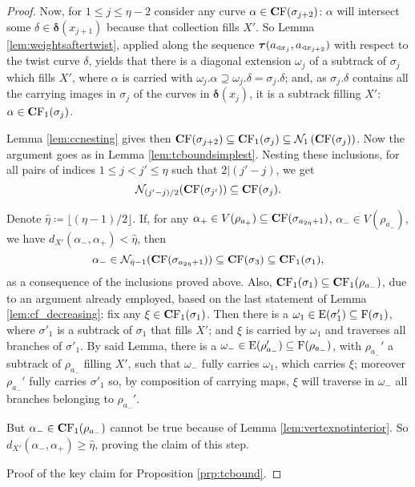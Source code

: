 \begin{proof}
Now, for $1\leq j\leq \eta-2$ consider any curve $\alpha\in \mathbf C \mathrm F(\sigma_{j+2})$: $\alpha$ will intersect some $\delta\in \bm\delta(x_{j+1})$ because that collection fills $X'$. So Lemma \ref{lem:weightsaftertwist}, applied along the sequence $\bm\tau(a_{\triangleleft x_j},a_{\triangleleft x_{j+2}})$ with respect to the twist curve $\delta$, yields that there is a diagonal extension $\omega_j$ of a subtrack of $\sigma_j$ which fills $X'$, where $\alpha$ is carried with $\omega_j.\alpha\supseteq \omega_j.\delta=\sigma_j.\delta$; and, as $\sigma_j.\delta$ contains all the carrying images in $\sigma_j$ of the curves in $\bm\delta(x_j)$, it is a subtrack filling $X'$: $\alpha\in \mathbf C \mathrm F_1(\sigma_j)$.

Lemma \ref{lem:ccnesting} gives then $\mathbf C \mathrm F(\sigma_{j+2})\subseteq \mathbf C \mathrm F_1(\sigma_j)\subseteq {\mathcal N}_1\left(\mathbf C \mathrm F(\sigma_j)\right)$. Now the argument goes as in Lemma \ref{lem:tcboundsimplest}. Nesting these inclusions, for all pairs of indices $1\leq j<j'\leq \eta$ such that $2|(j'-j)$, we get
$$
\mathcal N_{(j'-j)/2}(\mathbf C \mathrm F(\sigma_{j'}))\subseteq \mathbf C \mathrm F(\sigma_j).
$$

Denote $\hat \eta\coloneqq \lfloor(\eta-1)/2\rfloor$. If, for any $\alpha_+\in V(\rho_{a_+})\subseteq \mathbf C \mathrm F(\sigma_{a_{2\hat \eta}+1})$, $\alpha_-\in V(\rho_{a_-})$, we have $d_{X'}(\alpha_-,\alpha_+)< \hat\eta$, then
$$\alpha_- \in \mathcal N_{\hat\eta - 1}(\mathbf C \mathrm F(\sigma_{a_{2\hat \eta}+1}))\subseteq \mathbf C \mathrm F(\sigma_{3}) \subseteq \mathbf C \mathrm F_1(\sigma_1),$$
as a consequence of the inclusions proved above. Also, $\mathbf C \mathrm F_1(\sigma_1)\subseteq \mathbf C \mathrm F_1(\rho_{a_-})$, due to an argument already employed, based on the last statement of Lemma \ref{lem:cf_decreasing}: fix any $\xi\in \mathbf C \mathrm F_1(\sigma_1)$. Then there is a $\omega_1\in \mathrm{E}(\sigma'_1)\subseteq \mathrm{F}(\sigma_1)$, where $\sigma'_1$ is a subtrack of $\sigma_1$ that fills $X'$; and $\xi$ is carried by $\omega_1$ and traverses all branches of $\sigma'_1$. By said Lemma, there is a $\omega_-\in \mathrm{E}(\rho_{a_-}')\subseteq \mathrm{F}(\rho_{a_-})$, with $\rho_{a_-}'$ a subtrack of $\rho_{a_-}$ filling $X'$, such that $\omega_-$ fully carries $\omega_1$, which carries $\xi$; moreover $\rho_{a_-}'$ fully carries $\sigma'_1$ so, by composition of carrying maps, $\xi$ will traverse in $\omega_-$ all branches belonging to $\rho_{a_-}'$.

But $\alpha_- \in \mathbf C \mathrm F_1(\rho_{a_-})$ cannot be true because of Lemma \ref{lem:vertexnotinterior}. So $d_{X'}(\alpha_-,\alpha_+)\geq \hat \eta$, proving the claim of this step.

 Proof of the key claim for Proposition \ref{prp:tcbound}.


\end{proof}
